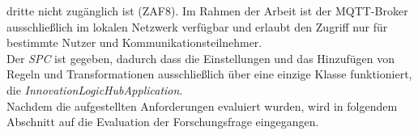         dritte nicht zugänglich ist (ZAF8). Im Rahmen der Arbeit ist der \acs{MQTT}-Broker ausschließlich im lokalen Netzwerk verfügbar und erlaubt den Zugriff nur für bestimmte Nutzer und Kommunikationsteilnehmer. 
        \\
        \linebreak
        Der \textit{\acl{SPC}} ist gegeben, dadurch dass die Einstellungen und das Hinzufügen von Regeln und Transformationen ausschließlich über eine einzige Klasse funktioniert, die \textit{InnovationLogicHubApplication}. 
        \\
        \linebreak
        Nachdem die aufgestellten Anforderungen evaluiert wurden, wird in folgendem Abschnitt auf die Evaluation der Forschungsfrage eingegangen.
        \pagebreak


